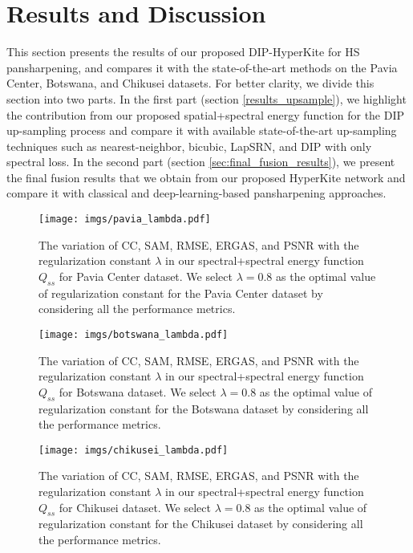 \documentclass[journal]{IEEEtran}
\begin{document}
\section{Results and Discussion}
\label{sec: results}
This section presents the results of our proposed DIP-HyperKite for HS pansharpening, and compares it with the state-of-the-art methods on the Pavia Center, Botswana, and Chikusei datasets. For better clarity, we divide this section into two parts. In the first part (section \ref{results_upsample}), we highlight the contribution from our proposed spatial+spectral energy function for the DIP up-sampling process and compare it with available state-of-the-art up-sampling techniques such as  nearest-neighbor, bicubic, LapSRN, and DIP with only spectral loss. In the second part (section \ref{sec:final_fusion_results}), we present the final fusion results that we obtain from our proposed HyperKite network and compare it with classical and deep-learning-based pansharpening approaches. 
    \begin{figure}[tb]
            \centering
            \texttt{[image: imgs/pavia\_lambda.pdf]}
            \caption{The variation of CC, SAM, RMSE, ERGAS, and PSNR with the regularization constant $\lambda$ in our spectral+spectral energy function $Q_{ss}$ for Pavia Center dataset. We select $\lambda= 0.8$ as the optimal value of regularization constant for the Pavia Center dataset by considering all the performance metrics.}
            \label{fig:pavia_lambda_tune_ql}
    \end{figure}
    \begin{figure}[tb]
        \centering
        \texttt{[image: imgs/botswana\_lambda.pdf]}
        \caption{The variation of CC, SAM, RMSE, ERGAS, and PSNR with the regularization constant $\lambda$ in our spectral+spectral energy function $Q_{ss}$ for Botswana dataset. We select $\lambda= 0.8$ as the optimal value of regularization constant for the Botswana dataset by considering all the performance metrics.}
        \label{fig:botswana_lambda_tune_ql}
    \end{figure}
    \begin{figure}[tb]
        \centering
        \texttt{[image: imgs/chikusei\_lambda.pdf]}
        \caption{The variation of CC, SAM, RMSE, ERGAS, and PSNR with the regularization constant $\lambda$ in our spectral+spectral energy function $Q_{ss}$ for Chikusei dataset. We select $\lambda= 0.8$ as the optimal value of regularization constant for the Chikusei dataset by considering all the performance metrics.}
        \label{fig:chikusei_lambda_tune_ql}
    \end{figure}
    
\end{document}
